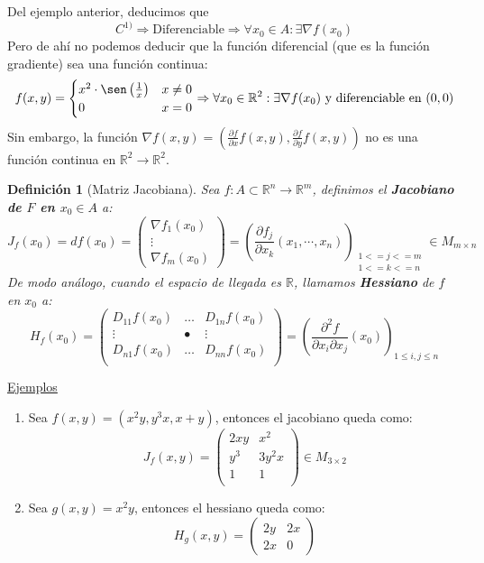 \documentclass[10pt,a4paper,openright]{book}
\theoremstyle{break}
\newtheorem*{defi}{Definición}
\begin{document}
Del ejemplo anterior, deducimos que
$$C^{1)}\Rightarrow \mbox{Diferenciable} \Rightarrow \forall x_0 \in A: \exists \nabla f(x_0)$$
Pero de ahí no podemos deducir que la función diferencial (que es la función gradiente) sea una función continua:
$$f(x,y) = \begin{cases} x^2 \cdot \sen\left(\frac{1}{x}\right)  & x \neq 0 \\ 0 & x = 0 \end{cases} \Rightarrow \forall x_0\in \mathbb R^2: \exists\nabla f(x_0) \mbox{ y diferenciable en }(0,0)$$
Sin embargo, la función $\nabla f(x,y) = (\frac{\partial f}{\partial x}f(x,y), \frac{\partial f}{\partial y} f(x,y))$ no es una función continua en $\mathbb{R}^2 \to \mathbb{R}^2$.

\begin{defi}[Matriz Jacobiana]
Sea $f : A \subset \mathbb{R}^n \to \mathbb{R}^m$, definimos el \textbf{Jacobiano de $F$ en $x_0 \in A$} a:
$$J_f (x_0) = df(x_0) = \begin{pmatrix} \nabla f_1(x_0) \\ \vdots \\ \nabla f_m (x_0)\end{pmatrix} = \left(\frac{\partial f_j}{\partial x_k}(x_1, \cdots , x_n)\right)_{\substack{1 <= j <= m \\ 1<= k <= n}} \in M_{m \times n}$$
De modo análogo, cuando el espacio de llegada es $\mathbb{R}$, llamamos  \textbf{Hessiano} de $f$ en $x_0$ a:
$$H_f (x_0) = \begin{pmatrix} D_{11} f(x_0) & \ldots & D_{1n}f(x_0) \\ \vdots & • & \vdots \\ D_{n1}f(x_0) & \ldots & D_{nn}f(x_0) \\
\end{pmatrix} = \left( \frac{\partial^2 f}{\partial x_i \partial x_j } (x_0)\right)_{1 \leq i,j \leq n}$$
\end{defi}

\underline{Ejemplos}
\begin{enumerate}
\item Sea $f(x,y) = (x^2 y , y^3 x, x+y)$, entonces el jacobiano queda como:
$$J_f (x,y) = \begin{pmatrix} 2xy & x^2 \\ y^3 & 3y^2 x  \\ 1 & 1  \\\end{pmatrix} \in M_{3 \times 2}$$
\item Sea $g(x,y) = x^2y$, entonces el hessiano queda como:
$$H_g (x,y) = \begin{pmatrix} 2y & 2x  \\ 2x & 0 \end{pmatrix}$$
\end{enumerate}
\end{document}
